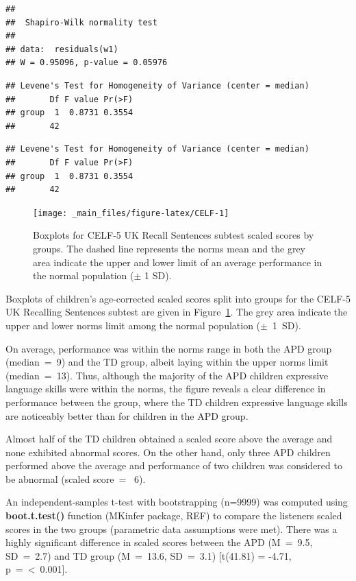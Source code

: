 \documentclass[a4paper, twoside]{templates/ociamthesis}
\begin{document}
\begin{verbatim}
## 
##  Shapiro-Wilk normality test
## 
## data:  residuals(w1)
## W = 0.95096, p-value = 0.05976
\end{verbatim}

\begin{verbatim}
## Levene's Test for Homogeneity of Variance (center = median)
##       Df F value Pr(>F)
## group  1  0.8731 0.3554
##       42
\end{verbatim}

\begin{verbatim}
## Levene's Test for Homogeneity of Variance (center = median)
##       Df F value Pr(>F)
## group  1  0.8731 0.3554
##       42
\end{verbatim}

\begin{figure}

{\centering \texttt{[image: \_main\_files/figure-latex/CELF-1]} 

}

\caption{Boxplots for CELF-5 UK Recall Sentences subtest scaled scores by groups. The dashed line represents the norms mean and the grey area indicate the upper and lower limit of an average performance in the normal population ($\pm$ 1 SD).}\label{fig:CELF}
\end{figure}

Boxplots of children's age-corrected scaled scores split into groups for the CELF-5 UK Recalling Sentences subtest are given in Figure~\ref{fig:CELF}. The grey area indicate the upper and lower norms limit among the normal population (\(\pm\)~1~SD).

On average, performance was within the norms range in both the APD group (median~=~9) and the TD group, albeit laying within the upper norms limit (median~=~13). Thus, although the majority of the APD children expressive language skills were within the norms, the figure reveals a clear difference in performance between the group, where the TD children expressive language skills are noticeably better than for children in the APD group.

Almost half of the TD children obtained a scaled score above the average and none exhibited abnormal scores. On the other hand, only three APD children performed above the average and performance of two children was considered to be abnormal (scaled score~= ~6).

An independent-samples t-test with bootstrapping (n=9999) was computed using \textbf{boot.t.test()} function (MKinfer package, REF) to compare the listeners scaled scores in the two groups (parametric data assumptions were met). There was a highly significant difference in scaled scores between the APD (M~=~9.5, SD~=~2.7) and TD group (M~=~13.6, SD~=~3.1) {[}t(41.81) = -4.71, p~=~\textless~0.001{]}.
\end{document}
